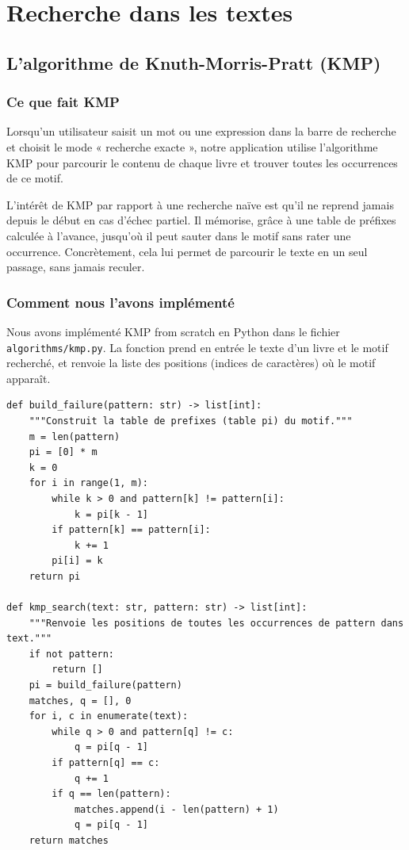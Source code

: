 \documentclass[12pt,a4paper]{article}
\begin{document}
\section{Recherche dans les textes}

\subsection{L'algorithme de Knuth-Morris-Pratt (KMP)}

\subsubsection{Ce que fait KMP}

Lorsqu'un utilisateur saisit un mot ou une expression dans la barre de
recherche et choisit le mode « recherche exacte », notre application utilise
l'algorithme KMP pour parcourir le contenu de chaque livre et trouver toutes
les occurrences de ce motif.

L'intérêt de KMP par rapport à une recherche naïve est qu'il ne reprend jamais
depuis le début en cas d'échec partiel. Il mémorise, grâce à une table de
préfixes calculée à l'avance, jusqu'où il peut \og sauter\fg{} dans le motif
sans rater une occurrence. Concrètement, cela lui permet de parcourir le texte
en un seul passage, sans jamais reculer.

\subsubsection{Comment nous l'avons implémenté}

Nous avons implémenté KMP from scratch en Python dans le fichier
\texttt{algorithms/kmp.py}. La fonction prend en entrée le texte d'un livre
et le motif recherché, et renvoie la liste des positions (indices de caractères)
où le motif apparaît.

\begin{lstlisting}[style=python, caption={Implémentation de KMP.}, label=lst:kmp]
def build_failure(pattern: str) -> list[int]:
    """Construit la table de prefixes (table pi) du motif."""
    m = len(pattern)
    pi = [0] * m
    k = 0
    for i in range(1, m):
        while k > 0 and pattern[k] != pattern[i]:
            k = pi[k - 1]
        if pattern[k] == pattern[i]:
            k += 1
        pi[i] = k
    return pi

def kmp_search(text: str, pattern: str) -> list[int]:
    """Renvoie les positions de toutes les occurrences de pattern dans text."""
    if not pattern:
        return []
    pi = build_failure(pattern)
    matches, q = [], 0
    for i, c in enumerate(text):
        while q > 0 and pattern[q] != c:
            q = pi[q - 1]
        if pattern[q] == c:
            q += 1
        if q == len(pattern):
            matches.append(i - len(pattern) + 1)
            q = pi[q - 1]
    return matches
\end{lstlisting}
\end{document}
